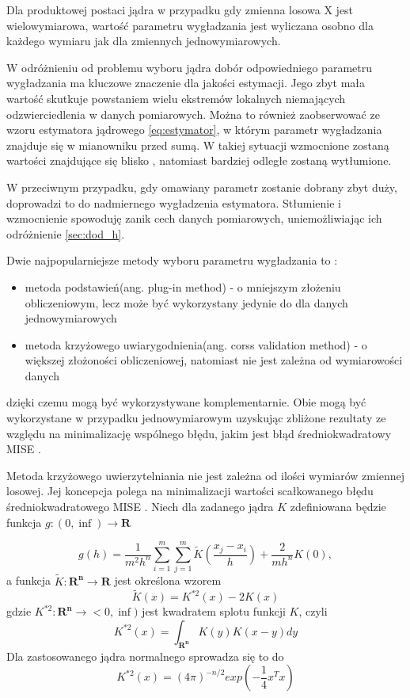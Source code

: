 Dla produktowej postaci jądra w przypadku gdy zmienna losowa X jest wielowymiarowa, wartość parametru wygładzania jest wyliczana osobno dla każdego wymiaru jak dla zmiennych jednowymiarowych. 

W odróżnieniu od problemu wyboru jądra dobór odpowiedniego parametru wygładzania ma kluczowe znaczenie dla jakości estymacji. Jego zbyt mała wartość skutkuje powstaniem wielu ekstremów lokalnych niemających odzwierciedlenia w danych pomiarowych. Można to również zaobserwować ze wzoru estymatora jądrowego \eqref{eq:estymator}, w którym parametr wygładzania znajduje się w mianowniku przed sumą. W takiej sytuacji wzmocnione zostaną wartości znajdujące się blisko , natomiast bardziej odległe zostaną wytłumione.

W przeciwnym przypadku, gdy omawiany parametr zostanie dobrany zbyt duży, doprowadzi to do nadmiernego wygładzenia estymatora. Stłumienie  i wzmocnienie  spowoduję zanik cech danych pomiarowych, uniemożliwiając ich odróżnienie \ref{sec:dod_h}.

Dwie najpopularniejsze metody wyboru parametru wygładzania to : \cite{Kul10} 
\begin{itemize}
\item metoda podstawień(ang. plug-in method) - o mniejszym złożeniu obliczeniowym, lecz może być wykorzystany jedynie do dla danych jednowymiarowych
\item metoda krzyżowego uwiarygodnienia(ang. corss validation method) - o większej złożoności obliczeniowej, natomiast nie jest zależna od wymiarowości danych
\end{itemize}
dzięki czemu mogą być wykorzystywane komplementarnie. Obie mogą być wykorzystane w przypadku jednowymiarowym uzyskując zbliżone rezultaty ze względu na minimalizację wspólnego błędu, jakim jest błąd średniokwadratowy MISE \cite{Kul05}.

Metoda krzyżowego uwierzytelniania nie jest zależna od ilości wymiarów zmiennej losowej. Jej koncepcja polega na minimalizacji wartości scałkowanego błędu średniokwadratowego MISE \cite{Kul05} \cite{Kul10}. Niech dla zadanego jądra $K$ zdefiniowana będzie funkcja $g:(0,\inf ) \rightarrow \mathbf{R}$

\begin{equation}
\label{eq:g_h}
g(h)=\frac{1}{m^2h^n}\displaystyle\sum_{i=1}^{m} \displaystyle\sum_{j=1}^{m} \widetilde{K}(\frac{x_j - x_i}{h}) + \frac{2}{mh^n}K(0),
\end{equation}
a funkcja $\widetilde{K}: \mathbf{R^n} \rightarrow \mathbf{R}$ jest określona wzorem
\begin{equation}
\widetilde{K}(x) = K^{*2}(x) - 2K(x)
\end{equation}
gdzie $K^{*2}: \mathbf{R^n} \rightarrow <0, \inf )$ jest kwadratem splotu funkcji $K$, czyli
\begin{equation}
K^{*2}(x) = \int_{\mathbf{R^n}}K(y)K(x-y)dy
\end{equation}
Dla zastosowanego jądra normalnego sprowadza się to do 
\begin{equation}
K^{*2}(x) = (4\pi)^{-n/2} exp(-\frac{1}{4}x^Tx)
\end{equation}


